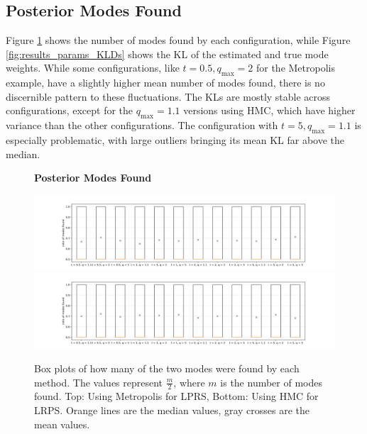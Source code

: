 \documentclass[12pt, a4paper]{report}
\begin{document}
\subsection{Posterior Modes Found}
Figure \ref{fig:results_params_modes_found} shows the number of modes found by each configuration, while Figure \ref{fig:results_params_KLDs} shows the KL of the estimated and true mode weights.
While some configurations, like $t = 0.5, q_{\textrm{max}} = 2$ for the Metropolis example, have a slightly higher mean number of modes found, there is no discernible pattern to these fluctuations.
The KLs are mostly stable across configurations, except for the $q_{\textrm{max}} = 1.1$ versions using HMC, which have higher variance than the other configurations.
The configuration with $t = 5, q_{\textrm{max}} = 1.1$ is especially problematic, with large outliers bringing its mean KL far above the median.
\begin{figure}
    \centering
    {\small \textbf{Posterior Modes Found} \par}
    \includegraphics[trim={3cm 0cm 3cm 0cm}, clip, width=\textwidth]{figs/results/params/modes_found_metropolis.png}
    \includegraphics[trim={3cm 0cm 3cm 0cm}, clip, width=\textwidth]{figs/results/params/modes_found_hmc.png}
    \caption{Box plots of how many of the two modes were found by each method. The values represent $\frac{m}{2}$, where $m$ is the number of modes found. Top: Using Metropolis for LPRS, Bottom: Using HMC for LRPS. Orange lines are the median values, gray crosses are the mean values.}
    \label{fig:results_params_modes_found}
\end{figure}
\end{document}
